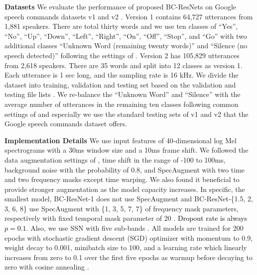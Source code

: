 \documentclass[a4paper]{article}
\newcommand\bg[1]{\textcolor{blue}{#1}}
\renewcommand\bg[1]{\textcolor{black}{#1}}
\begin{document}
\noindent \textbf{Datasets} We evaluate the performance of proposed BC-ResNets on Google speech commands datasets v1 and v2 \cite{speechdataset}. Version 1 contains 64,727 utterances from 1,881 speakers. There are total thirty words and we use ten classes of ``Yes'', ``No'', ``Up'', ``Down'', ``Left'', ``Right'', ``On'', ``Off'', ``Stop'', and ``Go'' with two additional classes ``Unknown Word (remaining twenty words)'' and ``Silence (no speech detected)'' following the settings of \cite{speechdataset}. Version 2 has 105,829 utterances from 2,618 speakers. There are 35 words and split into 12 classes as version 1. Each utterance is 1 sec long, and the sampling rate is 16 kHz. We divide the dataset into training, validation and testing set based on the validation and testing file lists \cite{speechdataset}. We re-balance the ``Unknown Word'' and ``Silence'' with the average number of utterances in the remaining ten classes following common settings of \cite{speechdataset, res15, mhatt-rnn} and especially we use the standard testing sets of v1 and v2 that the Google speech commands dataset offers. 


\noindent \textbf{Implementation Details} We use input features of 40-dimensional log Mel spectrograms with a 30ms window size and a 10ms frame shift. We followed the data augmentation settings of \cite{res15}, time shift in the range of -100 to 100ms, background noise \cite{speechdataset} with the probability of $0.8$, and SpecAugment \cite{specaugment} with two time and two frequency masks except time warping. We also found it beneficial to provide stronger augmentation as the model capacity increases. In specific, the smallest model, BC-ResNet-1 does not use SpecAugment and BC-ResNet-\{1.5, 2, 3, 6, 8\} use SpecAugment with \{1, 3, 5, 7, 7\} of frequency mask parameters, respectively with fixed temporal mask parameter of 20 \cite{specaugment}. \bg{Dropout rate is always $p=0.1$}. Also, we use SSN with five sub-bands \cite{ssn}. 
All models are trained for 200 epochs with stochastic gradient descent (SGD) optimizer with momentum to 0.9, weight decay to 0.001, minibatch size to 100, and a learning rate which linearly increases from zero to 0.1 over the first five epochs as warmup \cite{warmup} before decaying to zero with cosine annealing \cite{cosine_schedule}.
\end{document}
